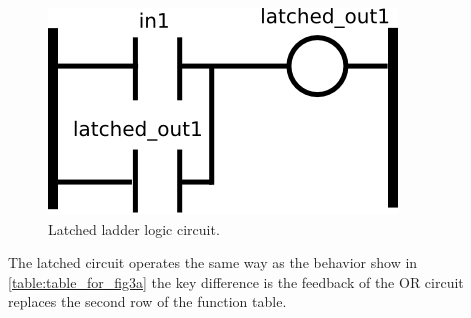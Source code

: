 \begin{figure}[htp]
    \centering
    \includegraphics[width=\imgsmall]{./images/intro_fig_latched.png} 
    \caption{Latched ladder logic circuit.}
    \label{fig:intro_fig_latched}
\end{figure}

The latched circuit operates the same way as the behavior show in \ref{table:table_for_fig3a} the key difference is the feedback of the OR circuit replaces the second row of the function table.
